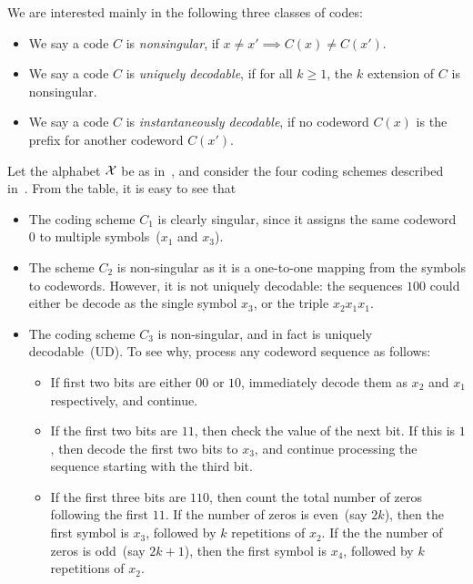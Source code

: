     \begin{definition}
    \label{def:types-of-codes} We are interested mainly in the following three classes of codes: 
      \begin{itemize}
            \item We say a code $C$ is \emph{nonsingular}, if $x \neq x' \implies C(x) \neq C(x')$. 
            \item We say a code $C$ is \emph{uniquely decodable}, if for all $k \geq 1$, the $k$ extension of $C$ is nonsingular. 
            \item We say a code $C$ is \emph{instantaneously decodable}, if no codeword $C(x)$ is the prefix for another codeword $C(x')$. 
        \end{itemize}
    \end{definition}
     \begin{example}
        \label{example:source-codes-2}  Let the alphabet $\mathcal{X}$ be  as in~, and consider the four coding schemes described in~. 
        From the table, it is easy to see that 
        \begin{itemize}
            \item The coding scheme $C_1$ is clearly singular, since it assigns the same codeword $0$ to multiple symbols~($x_1$ and $x_3$). 
            \item The scheme $C_2$ is non-singular as it is a one-to-one mapping from the symbols to codewords. However, it is not uniquely decodable: the sequences $100$ could either be decode as the single symbol $x_3$, or the triple $x_2x_1x_1$. 
            \item The coding scheme $C_3$ is non-singular, and in fact is uniquely decodable~(UD). To see why, process any codeword sequence as follows:
            \begin{itemize}
                \item If first two bits are either $00$ or $10$, immediately decode them as $x_2$ and $x_1$ respectively, and continue. 
                \item If the first two bits are $11$, then check the value of the next bit. If this is $1$, then decode the first two bits to $x_3$, and continue processing the sequence starting with the third bit. 
                \item If the first three bits are $110$, then count the total number of zeros following the first $11$. If the number of zeros is even~(say $2k$), then the first symbol is $x_3$, followed by $k$ repetitions of $x_2$. If the the number of zeros is odd~(say $2k+1$), then the first symbol is $x_4$, followed by $k$ repetitions of $x_2$.   

\end{itemize}
\end{itemize}
\end{example}
